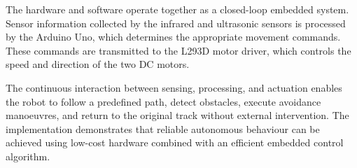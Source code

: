 The hardware and software operate together as a closed-loop embedded system. Sensor information collected by the infrared and ultrasonic sensors is processed by the Arduino Uno, which determines the appropriate movement commands. These commands are transmitted to the L293D motor driver, which controls the speed and direction of the two DC motors.

The continuous interaction between sensing, processing, and actuation enables the robot to follow a predefined path, detect obstacles, execute avoidance manoeuvres, and return to the original track without external intervention. The implementation demonstrates that reliable autonomous behaviour can be achieved using low-cost hardware combined with an efficient embedded control algorithm.
